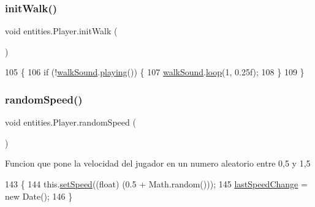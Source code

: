 \subsubsection{\texorpdfstring{init\+Walk()}{initWalk()}}
{\footnotesize\ttfamily void entities.\+Player.\+init\+Walk (\begin{DoxyParamCaption}{ }\end{DoxyParamCaption})\hspace{0.3cm}{\ttfamily [inline]}}


\begin{DoxyCode}
105                            \{
106         \textcolor{keywordflow}{if} (!\mbox{\hyperlink{classentities_1_1_player_a79a5a286c847ddeebb54102f66b009a0}{walkSound}}.\mbox{\hyperlink{classorg_1_1newdawn_1_1slick_1_1_sound_ad5eea07a2c542c26890a497fb21bcb34}{playing}}()) \{
107             \mbox{\hyperlink{classentities_1_1_player_a79a5a286c847ddeebb54102f66b009a0}{walkSound}}.\mbox{\hyperlink{classorg_1_1newdawn_1_1slick_1_1_sound_a6642a989affb6089a72cd6ee5150a146}{loop}}(1, 0.25f);
108         \}
109     \}
\end{DoxyCode}
\mbox{\label{classentities_1_1_player_a0735d0ed04f027c6c4caa2816771a316}} 
\subsubsection{\texorpdfstring{random\+Speed()}{randomSpeed()}}
{\footnotesize\ttfamily void entities.\+Player.\+random\+Speed (\begin{DoxyParamCaption}{ }\end{DoxyParamCaption})\hspace{0.3cm}{\ttfamily [inline]}}

Funcion que pone la velocidad del jugador en un numero aleatorio entre 0,5 y 1,5 
\begin{DoxyCode}
143                               \{
144         this.\mbox{\hyperlink{classentities_1_1_mobile_entity_a8b9394d985435fba88149c9dded2e69d}{setSpeed}}((\textcolor{keywordtype}{float}) (0.5 + Math.random()));
145         \mbox{\hyperlink{classentities_1_1_player_aa19245e93679111fca5ca4458fecee53}{lastSpeedChange}} = \textcolor{keyword}{new} Date();
146     \}
\end{DoxyCode}
\mbox{\label{classentities_1_1_player_a213cd954c2c29ef74e6e91a31c03befe}} 
